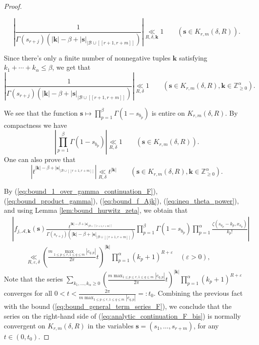 \documentclass[a4paper]{amsart}
\theoremstyle{remark}
\theoremstyle{definition}
\begin{document}
\begin{proof}
\begin{enumerate}
$$ \left|\frac{1}{\Gamma(s_{r+j})(|\mathbf{k}|-\beta+|\mathbf{s}|_{|\mathcal{B}\cup [\![ r+1,r+m ]\!]})}\right| \underset{R,\delta,\mathbf{k}}{\ll} 1 \qquad (\mathbf{s} \in K_{r,m}(\delta,R)). $$
\end{enumerate}
Since there's only a finite number of nonnegative tuples $\mathbf{k}$ satisfying $k_1+\cdots+k_{\alpha} \leq \beta$, we get that
\begin{equation}
    \left|\frac{1}{\Gamma(s_{r+j})(|\mathbf{k}|-\beta+|\mathbf{s}|_{|\mathcal{B}\cup [\![ r+1,r+m ]\!]})}\right| \underset{R,\delta}{\ll} 1 \qquad (\mathbf{s} \in K_{r,m}(\delta,R), \mathbf{k} \in \mathbb{Z}_{\geq 0}^{\alpha}). \label{eq:bound_1_over_gamma_continuation_F}
\end{equation}

We see that the function $\mathbf{s} \mapsto \prod_{p=1}^{\beta} \Gamma(1-s_{b_p})$ is entire on $K_{r,m}(\delta,R)$. By compactness we have
\begin{equation}
    \left|\prod_{p=1}^{\beta} \Gamma(1-s_{b_p}) \right| \underset{R,\delta}{\ll} 1 \qquad (\mathbf{s} \in K_{r,m}(\delta,R)). \label{eq:bound_product_gamma}
\end{equation}
One can also prove that
\begin{equation}
    \left|t^{|\mathbf{k}|-\beta+|\mathbf{s}|_{|\mathcal{B}\cup [\![ r+1,r+m ]\!]}}\right| \underset{R,\delta}{\ll} t^{|\mathbf{k}|} \qquad (\mathbf{s} \in K_{r,m}(\delta,R), \mathbf{k} \in \mathbb{Z}_{\geq 0}^{\alpha}). \label{eq:ineq_theta_power}
\end{equation}

By (\ref{eq:bound_1_over_gamma_continuation_F}), (\ref{eq:bound_product_gamma}), (\ref{eq:bound_f_Ajk}), (\ref{eq:ineq_theta_power}), and using Lemma \ref{lem:bound_hurwitz_zeta}, we obtain that
\begin{align}
    &\left| f_{j,\mathcal{A},\mathbf{k}}(\mathbf{s}) \frac{t^{|\mathbf{k}|-\beta+|\mathbf{s}|_{|\mathcal{B}\cup [\![ r+1,r+m ]\!]}}}{\Gamma(s_{r+j})(|\mathbf{k}|-\beta+|\mathbf{s}|_{|\mathcal{B}\cup [\![ r+1,r+m ]\!]})} \prod_{p=1}^{\beta} \Gamma(1-s_{b_p}) \prod_{p=1}^{\alpha} \frac{\zeta(s_{a_p}-k_p,x_{a_p})}{k_p!} \right| \nonumber \\
    & \qquad \underset{R,\varepsilon,\delta}{\ll} \left(\frac{m \max_{1 \leq p \leq r, 1 \leq q \leq m}|c_{q,p}|}{2\pi} t\right)^{|\mathbf{k}|} \prod_{p=1}^{\alpha} (k_p+1)^{R+\varepsilon} \quad (\varepsilon>0), \label{eq:bound_general_term_series_F}
\end{align}
Note that the series $\sum_{k_1,\ldots,k_{\alpha} \geq 0} (\frac{m \max_{1 \leq p \leq r, 1 \leq q \leq m}|c_{q,p}|}{2\pi} t)^{|\mathbf{k}|} \prod_{p=1}^{\alpha} (k_p+1)^{R+\varepsilon}$ converges for all $0 < t < \frac{2\pi}{m \max_{1 \leq p \leq r, 1 \leq q \leq m}|c_{q,p}|} =: t_0$. Combining the previous fact with the bound (\ref{eq:bound_general_term_series_F}), we conclude that the series on the right-hand side of (\ref{eq:analytic_continuation_F_bis}) is normally convergent on $K_{r,m}(\delta,R)$ in the variables $\mathbf{s}=(s_1,\ldots,s_{r+m})$, for any $t \in (0,t_0)$.
\end{proof}
\end{document}
